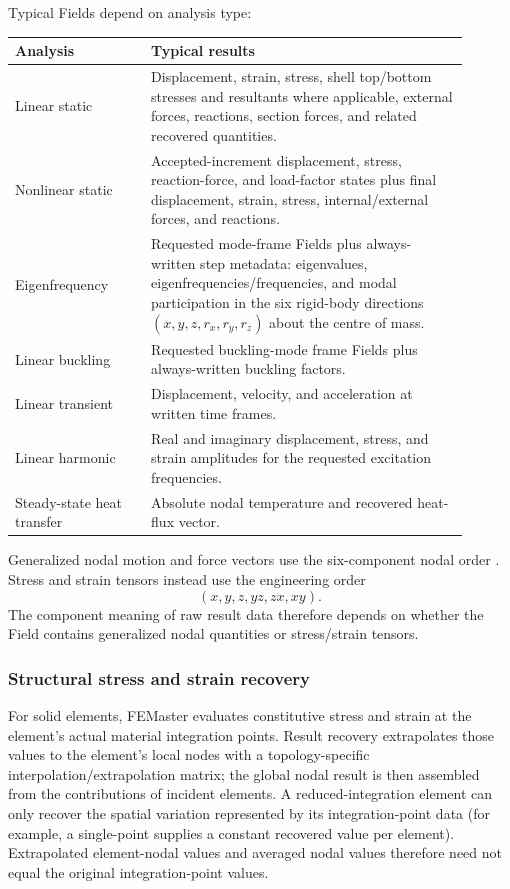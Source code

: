 Typical Fields depend on analysis type:
\begin{longtable}{@{}p{0.27\linewidth}p{0.63\linewidth}@{}}
\toprule
\textbf{Analysis} & \textbf{Typical results} \\
\midrule
\endhead
Linear static & Displacement, strain, stress, shell top/bottom stresses and resultants where applicable, external forces, reactions, section forces, and related recovered quantities. \\
Nonlinear static & Accepted-increment displacement, stress, reaction-force, and load-factor states plus final displacement, strain, stress, internal/external forces, and reactions. \\
Eigenfrequency & Requested mode-frame Fields plus always-written step metadata: eigenvalues, eigenfrequencies/frequencies, and modal participation in the six rigid-body directions \((x,y,z,r_x,r_y,r_z)\) about the centre of mass. \\
Linear buckling & Requested buckling-mode frame Fields plus always-written buckling factors. \\
Linear transient & Displacement, velocity, and acceleration at written time frames. \\
Linear harmonic & Real and imaginary displacement, stress, and strain amplitudes for the requested excitation frequencies. \\
Steady-state heat transfer & Absolute nodal temperature and recovered heat-flux vector. \\
\bottomrule
\end{longtable}

Generalized nodal motion and force vectors use the six-component nodal order \dofvec. Stress and strain tensors instead use the engineering order
\[
(x,y,z,yz,zx,xy).
\]
The component meaning of raw result data therefore depends on whether the Field contains generalized nodal quantities or stress/strain tensors.

\subsubsection*{Structural stress and strain recovery}

For solid elements, FEMaster evaluates constitutive stress and strain at the element's actual material integration points. Result recovery extrapolates those values to the element's local nodes with a topology-specific interpolation/extrapolation matrix; the global nodal result is then assembled from the contributions of incident elements. A reduced-integration element can only recover the spatial variation represented by its integration-point data (for example, a single-point  supplies a constant recovered value per element). Extrapolated element-nodal values and averaged nodal values therefore need not equal the original integration-point values.

